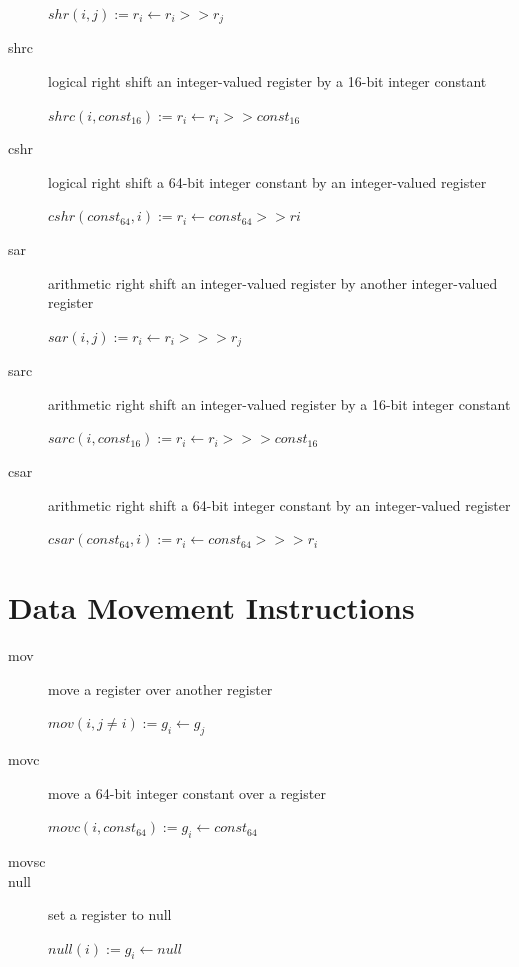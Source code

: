 \documentclass[english,a4paper]{report}
\begin{document}
\begin{description}
	$shr(i, j) := r _{i} \longleftarrow  r _{i} >> r _{j} $ \\
	\item[shrc] logical right shift an integer-valued register by a 
	16-bit integer constant
	
	$shrc(i, const _{16}) :=  r _{i} \longleftarrow  r _{i} >> const 
	_{16} $ \\
	\item[cshr] logical right shift a 64-bit integer constant by an
	integer-valued register
	
	$cshr(const _{64}, i):=  r _{i} \longleftarrow  const _{64} >> 
	r{i}  $  \\
	\item[sar] arithmetic right shift an integer-valued register by
	another integer-valued register
	
	$sar(i, j) :=  r _{i} \longleftarrow  r _{i} >>> r _{j} $  \\
	\item[sarc] arithmetic right shift an integer-valued register by a
	16-bit integer constant
	
	$sarc(i, const _{16}) :=  r _{i} \longleftarrow  r _{i} >>> const 
	_{16} $ \\
	\item[csar] arithmetic right shift a 64-bit integer constant by an
	integer-valued register
	
	$csar(const _{64}, i):=  r _{i} \longleftarrow  const _{64} >>> r 
	_{i}  $ \\
\end{description}

\section{Data Movement Instructions}
\begin{description}
	\item[mov] move a register over another register
	
	$mov(i, j \neq i) := g_{i} \longleftarrow g_{j} $ \\
	\item[movc] move a 64-bit integer constant over a register
	
	$movc(i, const_{64}):= g_{i} \longleftarrow const_{64} $ \\
	
	\item[movsc]
	
	\item[null] set a register to null
	
	$null(i):= g_{i} \longleftarrow null $ \\
\end{description}
\end{document}
